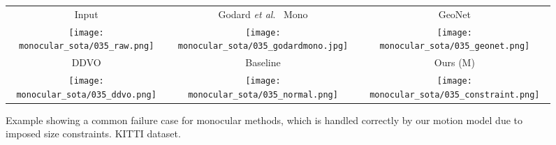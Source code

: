 \documentclass[10pt,twocolumn,letterpaper]{article}
\newcommand{\ea}{\textit{et al}.}
\begin{document}
\begin{figure*}
\centering
\begin{tabular}{@{\hskip 1mm}c@{\hskip 1mm}c@{\hskip 1mm}c@{}}

\small{Input} & \small{Godard \ea~\cite{godard2018digging} Mono} & \small{GeoNet \cite{yin2018geonet}}\\

\texttt{[image: monocular\_sota/035\_raw.png]} &
\texttt{[image: monocular\_sota/035\_godardmono.jpg]} &
\texttt{[image: monocular\_sota/035\_geonet.png]}\\

\small{DDVO \cite{wang2018learning}} & \small{Baseline} & \small{Ours (M)}\\

\texttt{[image: monocular\_sota/035\_ddvo.png]} &
\texttt{[image: monocular\_sota/035\_normal.png]} &  
\texttt{[image: monocular\_sota/035\_constraint.png]} \\

\end{tabular}
   \caption{Example showing a common failure case for monocular methods, which is handled correctly by our motion model due to imposed size constraints. KITTI dataset.}
\label{fig:forward_motion2}
    \vspace{-10pt}
\end{figure*}
\end{document}
